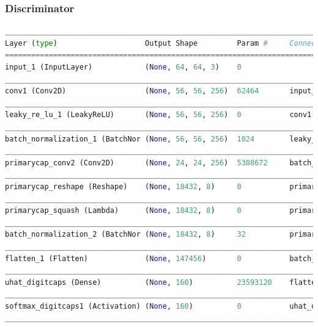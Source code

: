 \documentclass{vldb}
\begin{document}
\subsubsection{Discriminator} %
\label{sub:discriminator}
\begin{lstlisting}[basicstyle=\scriptsize,language=Python]
____________________________________________________________________________________________
Layer (type)                    Output Shape         Param #     Connected to               
============================================================================================
input_1 (InputLayer)            (None, 64, 64, 3)    0                                      
____________________________________________________________________________________________
conv1 (Conv2D)                  (None, 56, 56, 256)  62464       input_1[0][0]              
____________________________________________________________________________________________
leaky_re_lu_1 (LeakyReLU)       (None, 56, 56, 256)  0           conv1[0][0]                
____________________________________________________________________________________________
batch_normalization_1 (BatchNor (None, 56, 56, 256)  1024        leaky_re_lu_1[0][0]        
____________________________________________________________________________________________
primarycap_conv2 (Conv2D)       (None, 24, 24, 256)  5308672     batch_normalization_1[0][0]
____________________________________________________________________________________________
primarycap_reshape (Reshape)    (None, 18432, 8)     0           primarycap_conv2[0][0]     
____________________________________________________________________________________________
primarycap_squash (Lambda)      (None, 18432, 8)     0           primarycap_reshape[0][0]   
____________________________________________________________________________________________
batch_normalization_2 (BatchNor (None, 18432, 8)     32          primarycap_squash[0][0]    
____________________________________________________________________________________________
flatten_1 (Flatten)             (None, 147456)       0           batch_normalization_2[0][0]
____________________________________________________________________________________________
uhat_digitcaps (Dense)          (None, 160)          23593120    flatten_1[0][0]            
____________________________________________________________________________________________
softmax_digitcaps1 (Activation) (None, 160)          0           uhat_digitcaps[0][0]       
____________________________________________________________________________________________

\end{lstlisting}
\end{document}
